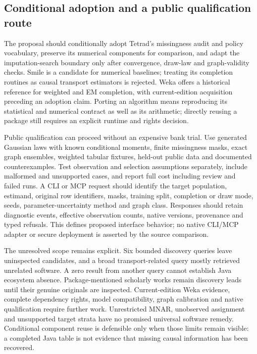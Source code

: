 \subsection*{Conditional adoption and a public qualification route}
The proposal should conditionally adopt Tetrad's missingness audit and policy vocabulary, preserve its numerical components for comparison, and adapt the imputation-search boundary only after convergence, draw-law and graph-validity checks. Smile is a candidate for numerical baselines; treating its completion routines as causal transport estimators is rejected. Weka offers a historical reference for weighted and EM completion, with current-edition acquisition preceding an adoption claim. Porting an algorithm means reproducing its statistical and numerical contract as well as its arithmetic; directly reusing a package still requires an explicit runtime and rights decision.~\citep{exec25_jtm_choice}

Public qualification can proceed without an expensive bank trial. Use generated Gaussian laws with known conditional moments, finite missingness masks, exact graph ensembles, weighted tabular fixtures, held-out public data and documented counterexamples. Test observation and selection assumptions separately, include malformed and unsupported cases, and report full cost including review and failed runs. A CLI or MCP request should identify the target population, estimand, original row identifiers, masks, training split, completion or draw mode, seeds, parameter-uncertainty method and graph class. Responses should retain diagnostic events, effective observation counts, native versions, provenance and typed refusals. This defines proposed interface behavior; no native CLI/MCP adapter or secure deployment is asserted by the source comparison.~\citep{exec25_jtm_choice}

The unresolved scope remains explicit. Six bounded discovery queries leave uninspected candidates, and a broad transport-related query mostly retrieved unrelated software. A zero result from another query cannot establish Java ecosystem absence. Package-mentioned scholarly works remain discovery leads until their genuine originals are inspected. Current-edition Weka evidence, complete dependency rights, model compatibility, graph calibration and native qualification require further work. Unrestricted MNAR, unobserved assignment and unsupported target strata have no promised universal software remedy. Conditional component reuse is defensible only when those limits remain visible: a completed Java table is not evidence that missing causal information has been recovered.~\citep{exec25_jtm_choice}


